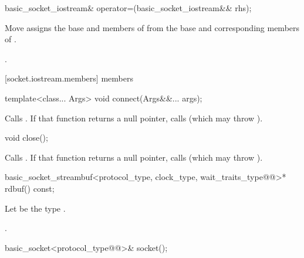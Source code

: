 \begin{itemdecl}
basic_socket_iostream& operator=(basic_socket_iostream&& rhs);
\end{itemdecl}

\begin{itemdescr}
\pnum
\effects Move assigns the base and members of  from the base and corresponding members of .

\pnum
\returns {}.
\end{itemdescr}



[socket.iostream.members]{ members}

\begin{itemdecl}
template<class... Args>
  void connect(Args&&... args);
\end{itemdecl}


\begin{itemdescr}
\pnum
\effects Calls . If that function returns a null pointer, calls  (which may throw ).
\end{itemdescr}

\begin{itemdecl}
void close();
\end{itemdecl}

\begin{itemdescr}
\pnum
\effects Calls . If that function returns a null pointer, calls  (which may throw ).
\end{itemdescr}

\begin{itemdecl}
basic_socket_streambuf<protocol_type, clock_type, wait_traits_type@@>* rdbuf() const;
\end{itemdecl}

\begin{itemdescr}
\pnum
Let  be the type .

\pnum
\returns {}.
\end{itemdescr}

\begin{itemdecl}
basic_socket<protocol_type@@>& socket();
\end{itemdecl}

